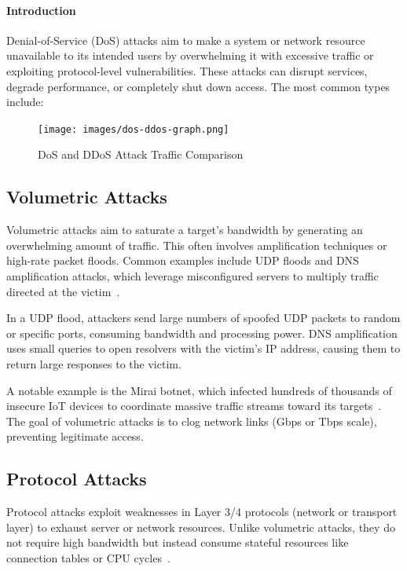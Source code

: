 \documentclass[16pt]{report}
\begin{document}
\paragraph{Introduction} 
Denial-of-Service (DoS) attacks aim to make a system or network resource unavailable to its intended users by overwhelming it with excessive traffic or exploiting protocol-level vulnerabilities. These attacks can disrupt services, degrade performance, or completely shut down access. The most common types include:

\begin{figure}[ht]
    \centering
    \texttt{[image: images/dos-ddos-graph.png]}
    \caption{DoS and DDoS Attack Traffic Comparison}
    \label{fig:dos-ddos-graph}
    \vspace{-0.5em}
\end{figure}

\subsection{Volumetric Attacks}
Volumetric attacks aim to saturate a target’s bandwidth by generating an overwhelming amount of traffic. This often involves amplification techniques or high-rate packet floods. Common examples include UDP floods and DNS amplification attacks, which leverage misconfigured servers to multiply traffic directed at the victim~\cite{fidelis_dos}.

In a UDP flood, attackers send large numbers of spoofed UDP packets to random or specific ports, consuming bandwidth and processing power. DNS amplification uses small queries to open resolvers with the victim’s IP address, causing them to return large responses to the victim. 

A notable example is the Mirai botnet, which infected hundreds of thousands of insecure IoT devices to coordinate massive traffic streams toward its targets~\cite{fidelis_dos}. The goal of volumetric attacks is to clog network links (Gbps or Tbps scale), preventing legitimate access.

\subsection{Protocol Attacks}
Protocol attacks exploit weaknesses in Layer 3/4 protocols (network or transport layer) to exhaust server or network resources. Unlike volumetric attacks, they do not require high bandwidth but instead consume stateful resources like connection tables or CPU cycles~\cite{fidelis_dos}.
\end{document}
